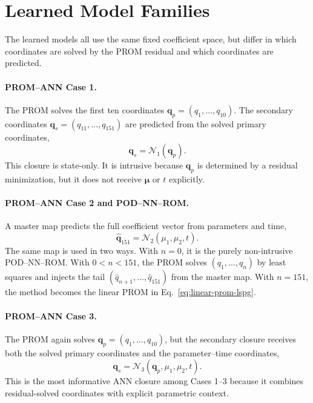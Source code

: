 \documentclass[11pt]{article}
\newcommand{\q}{\mathbf q}
\newcommand{\qp}{\mathbf q_p}
\newcommand{\qs}{\mathbf q_s}
\newcommand{\mub}{\bm\mu}
\begin{document}
\section{Learned Model Families}
The learned models all use the same fixed coefficient space, but differ in which coordinates are solved by the PROM
residual and which coordinates are predicted.

\paragraph{PROM--ANN Case 1.}
The PROM solves the first ten coordinates \(\qp=(q_1,\ldots,q_{10})\).  The secondary coordinates
\(\qs=(q_{11},\ldots,q_{151})\) are predicted from the solved primary coordinates,
\begin{equation}
  \qs = \mathcal N_1(\qp).
  \label{eq:case1}
\end{equation}
This closure is state-only.  It is intrusive because \(\qp\) is determined by a residual minimization, but it does
not receive \(\mub\) or \(t\) explicitly.

\paragraph{PROM--ANN Case 2 and POD--NN--ROM.}
A master map predicts the full coefficient vector from parameters and time,
\begin{equation}
  \widehat{\q}_{151}=\mathcal N_2(\mu_1,\mu_2,t).
  \label{eq:master-map}
\end{equation}
The same map is used in two ways.  With \(n=0\), it is the purely non-intrusive POD--NN--ROM.  With
\(0<n<151\), the PROM solves \((q_1,\ldots,q_n)\) by least squares and injects the tail
\((\widehat q_{n+1},\ldots,\widehat q_{151})\) from the master map.  With \(n=151\), the method becomes the
linear PROM in Eq.~\eqref{eq:linear-prom-lspg}.

\paragraph{PROM--ANN Case 3.}
The PROM again solves \(\qp=(q_1,\ldots,q_{10})\), but the secondary closure receives both the solved primary
coordinates and the parameter--time coordinates,
\begin{equation}
  \qs = \mathcal N_3(\qp,\mu_1,\mu_2,t).
  \label{eq:case3}
\end{equation}
This is the most informative ANN closure among Cases 1--3 because it combines residual-solved coordinates with
explicit parametric context.
\end{document}
